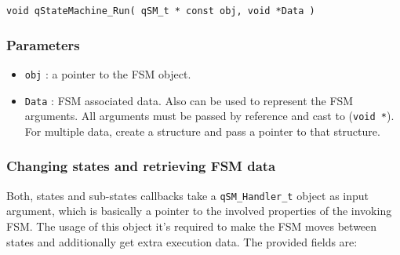 \begin{lstlisting}[style=CStyle]
void qStateMachine_Run( qSM_t * const obj, void *Data )
\end{lstlisting}

\subsubsection*{Parameters}
\begin{itemize}
    \item \lstinline{obj} : a pointer to the FSM object.
    \item \lstinline{Data} : FSM associated data. Also can be used to represent the FSM arguments. All arguments must be passed by reference and cast to (\lstinline{void *}). For multiple data, create a structure and pass a pointer to that structure.  
\end{itemize}  

\subsubsection{Changing states and retrieving FSM data}
Both, states and sub-states callbacks take a \lstinline{qSM_Handler_t}  object as input argument, which is basically a pointer to the involved properties of the invoking FSM. The usage of this object it's required to make the FSM moves between states and additionally get extra execution data. The provided fields are:

